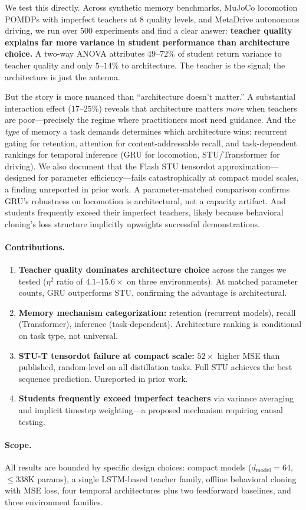 We test this directly.
Across synthetic memory benchmarks, MuJoCo locomotion POMDPs with imperfect teachers at 8 quality levels, and MetaDrive autonomous driving, we run over 500 experiments and find a clear answer: \textbf{teacher quality explains far more variance in student performance than architecture choice.}
A two-way ANOVA attributes $49$--$72\%$ of student return variance to teacher quality and only $5$--$14\%$ to architecture.
The teacher is the signal; the architecture is just the antenna.

But the story is more nuanced than ``architecture doesn't matter.''
A substantial interaction effect ($17$--$25\%$) reveals that architecture matters \emph{more} when teachers are poor---precisely the regime where practitioners most need guidance.
And the \emph{type} of memory a task demands determines which architecture wins: recurrent gating for retention, attention for content-addressable recall, and task-dependent rankings for temporal inference (GRU for locomotion, STU/Transformer for driving).
We also document that the Flash STU tensordot approximation---designed for parameter efficiency---fails catastrophically at compact model scales, a finding unreported in prior work.
A parameter-matched comparison confirms GRU's robustness on locomotion is architectural, not a capacity artifact.
And students frequently exceed their imperfect teachers, likely because behavioral cloning's loss structure implicitly upweights successful demonstrations.

\paragraph{Contributions.}
\begin{enumerate}[nosep]
  \item \textbf{Teacher quality dominates architecture choice} across the ranges we tested ($\eta^2$ ratio of $4.1$--$15.6\times$ on three environments). At matched parameter counts, GRU outperforms STU, confirming the advantage is architectural.
  \item \textbf{Memory mechanism categorization:} retention (recurrent models), recall (Transformer), inference (task-dependent). Architecture ranking is conditional on task type, not universal.
  \item \textbf{STU-T tensordot failure at compact scale:} $52\times$ higher MSE than published, random-level on all distillation tasks. Full STU achieves the best sequence prediction. Unreported in prior work.
  \item \textbf{Students frequently exceed imperfect teachers} via variance averaging and implicit timestep weighting---a proposed mechanism requiring causal testing.
\end{enumerate}

\paragraph{Scope.} All results are bounded by specific design choices: compact models ($d_\text{model}=64$, $\leq 338$K params), a single LSTM-based teacher family, offline behavioral cloning with MSE loss, four temporal architectures plus two feedforward baselines, and three environment families.
